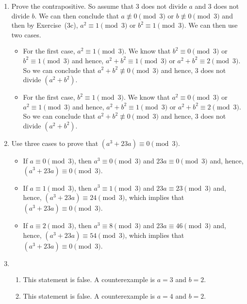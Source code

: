 \begin{enumerate}
\item Prove the contrapositive.  So assume that 3 does not divide $a$ and 3 does not divide 
$b$.  We can then conclude that $a \not\equiv 0 \pmod 3$ or $b \not\equiv 0 \pmod 3$ and then by Exercise~(3c), $a^2 \equiv 1 \pmod 3$ or $b^2 \equiv 1 \pmod 3$.  We can then use two cases.
\begin{itemize}
\item For the first case, $a^2 \equiv 1 \pmod 3$.  We know that $b^2 \equiv 0 \pmod 3$ or 
$b^2 \equiv 1 \pmod 3$ and hence,  $a^2 + b^2 \equiv 1 \pmod 3$ or 
$a^2 + b^2 \equiv 2 \pmod 3$.  So we can conclude that $a^2 + b^2 \not\equiv 0 \pmod 3$ and hence, 3 does not divide $(a^2 + b^2)$.

\item For the first case, $b^2 \equiv 1 \pmod 3$.  We know that $a^2 \equiv 0 \pmod 3$ or 
$a^2 \equiv 1 \pmod 3$ and hence,  $a^2 + b^2 \equiv 1 \pmod 3$ or 
$a^2 + b^2 \equiv 2 \pmod 3$.  So we can conclude that $a^2 + b^2 \not\equiv 0 \pmod 3$ and hence, 3 does not divide $(a^2 + b^2)$.
\end{itemize}


\item Use three cases to prove that $\left(a^3 + 23a \right) \equiv 0 \pmod 3$.
\begin{itemize}
\item If $a \equiv 0 \pmod 3$, then $a^3 \equiv 0 \pmod 3$ and 
$23a \equiv 0 \pmod 3$ and, hence, $\left(a^3 + 23a \right) \equiv 0 \pmod 3$.

\item If $a \equiv 1 \pmod 3$, then $a^3 \equiv 1 \pmod 3$ and 
$23a \equiv 23 \pmod 3$ and, hence, $\left(a^3 + 23a \right) \equiv 24 \pmod 3$, which implies that $\left(a^3 + 23a \right) \equiv 0 \pmod 3$.

\item If $a \equiv 2 \pmod 3$, then $a^3 \equiv 8 \pmod 3$ and 
$23a \equiv 46 \pmod 3$ and, hence, $\left(a^3 + 23a \right) \equiv 54 \pmod 3$, which implies that $\left(a^3 + 23a \right) \equiv 0 \pmod 3$.
\end{itemize}


\item \begin{enumerate}
\item This statement is false.  A counterexample is $a = 3$ and $b = 2$.

\item This statement is false.  A counterexample is $a = 4$ and $b = 2$.


\end{enumerate}
\end{enumerate}
